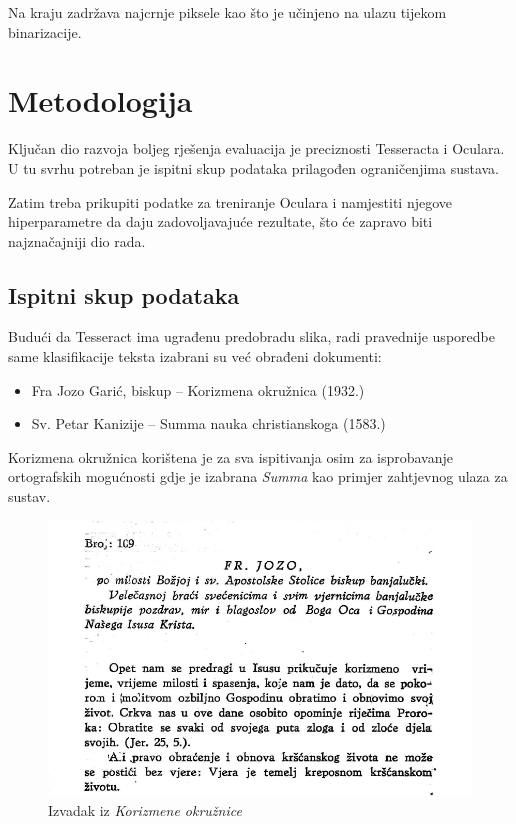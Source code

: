 \documentclass[zavrsnirad]{fer}
\begin{document}
Na kraju zadržava najcrnje piksele kao što je učinjeno na ulazu tijekom binarizacije.








\chapter{Metodologija}
\label{pog:metodologija}

Ključan dio razvoja boljeg rješenja evaluacija je preciznosti Tesseracta i Oculara. U tu svrhu potreban je ispitni skup podataka prilagođen ograničenjima sustava. 

Zatim treba prikupiti podatke za treniranje Oculara i namjestiti njegove hiperparametre da daju zadovoljavajuće rezultate, što će zapravo biti najznačajniji dio rada.


\section{Ispitni skup podataka}

Budući da Tesseract ima ugrađenu predobradu slika, radi pravednije usporedbe same klasifikacije teksta izabrani su već obrađeni dokumenti:

\begin{itemize}
	\item Fra Jozo Garić, biskup – Korizmena okružnica (1932.)
	\item Sv. Petar Kanizije – Summa nauka christianskoga (1583.)
\end{itemize}

Korizmena okružnica korištena je za sva ispitivanja osim za isprobavanje ortografskih mogućnosti gdje je izabrana \textit{Summa} kao primjer zahtjevnog ulaza za sustav.

\begin{figure}[h!]
	\centering
	\includegraphics[width=1.0\linewidth]{Figures/korizmena.png} 
	\caption{Izvadak iz \textit{Korizmene okružnice}}
	\label{slk:korizmena}
\end{figure}
\end{document}

